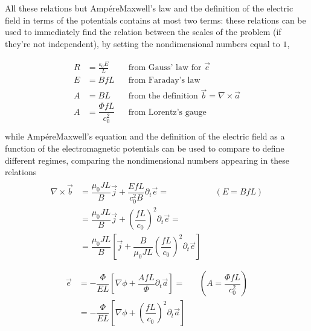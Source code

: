 \documentclass[letterpaper,10pt,english]{jupyterBook}
\begin{document}
\sphinxAtStartPar
All these relations but Ampére\sphinxhyphen{}Maxwell’s law and the definition of the electric field in terms of the potentials contains at most two terms: these relations can be used to immediately find the relation between the scales of the problem (if they’re not independent), by setting the non\sphinxhyphen{}dimensional numbers equal to \(1\),


\begin{equation*}
\begin{split}\begin{aligned}
  R & = \frac{\varepsilon_0 E}{L} && \text{from Gauss' law for $\vec{e}$} \\
  E & = B f L  && \text{from Faraday's law} \\
  A & = B L && \text{from the definition $\vec{b} = \nabla \times \vec{a}$} \\
  A & = \dfrac{\Phi f L}{c_0^2} && \text{from Lorentz's gauge} \\
\end{aligned}\end{split}
\end{equation*}
\sphinxAtStartPar
while Ampére\sphinxhyphen{}Maxwell’s equation and the definition of the electric field as a function of the electromagnetic potentials can be used to compare to define different regimes, comparing the non\sphinxhyphen{}dimensional numbers appearing in these relations
\begin{equation*}
\begin{split}\begin{aligned}
  \nabla \times \vec{b} 
  & = \dfrac{\mu_0 J L}{B} \vec{j} + \dfrac{E f L}{c_0^2 B} \partial_t \vec{e}  = && (E = B f L) \\
  & = \dfrac{\mu_0 J L}{B} \vec{j} + \left(\dfrac{f L}{c_0}\right)^2 \partial_t \vec{e} = \\
  & = \dfrac{\mu_0 J L}{B} \left[ \vec{j} + \dfrac{B}{\mu_0 J L} \left(\dfrac{f L}{c_0}\right)^2 \partial_t \vec{e} \right] \\
\end{aligned}\end{split}
\end{equation*}\begin{equation*}
\begin{split}\begin{aligned}
  \vec{e}
  & = - \dfrac{\Phi}{E L} \left[ \nabla \phi + \dfrac{A f L}{\Phi} \partial_t \vec{a} \right] = && \left( A = \dfrac{\Phi f L}{c_0^2} \right) \\ 
  & = - \dfrac{\Phi}{E L} \left[ \nabla \phi + \left( \dfrac{f L}{c_0} \right)^2 \partial_t \vec{a} \right]
\end{aligned}\end{split}
\end{equation*}
\sphinxstepscope
\end{document}
